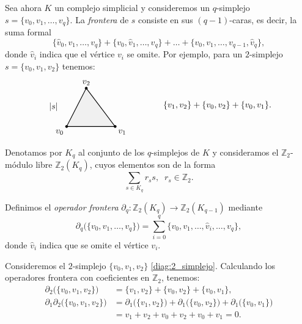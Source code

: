 Sea ahora $K$ un complejo simplicial y consideremos un $q$-simplejo $s = \{v_0, v_1, \dots, v_q\}$. La \textit{frontera} de $s$ consiste en sus $(q-1)$-caras, es decir, la suma formal
\[
\{\hat{v}_0, v_1, \dots, v_q\} + \{v_0, \hat{v}_1, \dots, v_q\} + \dots + \{v_0, v_1, \dots, v_{q-1}, \hat{v}_q\},
\]
donde $\hat{v}_i$ indica que el vértice $v_i$ se omite. Por ejemplo, para un $2$-simplejo $s = \{v_0, v_1, v_2\}$ tenemos:
\begin{equation}
\label{diag:2_simplejo}
\begin{tikzpicture}[baseline=(current bounding box.center), scale=0.95]
    \coordinate (V0) at (0, 0);
    \coordinate (V1) at (2.1, 0);
    \coordinate (V2) at (0.85, 1.65);

    \fill[gray!12] (V0) -- (V1) -- (V2) -- cycle;
    \draw[thick] (V0) -- (V1) -- (V2) -- cycle;

    \filldraw (V0) circle (1.5pt) node[below left] {$v_0$};
    \filldraw (V1) circle (1.5pt) node[below right] {$v_1$};
    \filldraw (V2) circle (1.5pt) node[above] {$v_2$};

    \node[left] at (-0.25, 0.85) {$|s|$};
\end{tikzpicture}
\qquad \qquad
\{v_1, v_2\} + \{v_0, v_2\} + \{v_0, v_1\}.
\end{equation}

\begin{definicion}
Denotamos por $K_q$ al conjunto de los $q$-simplejos de $K$ y consideramos el $\mathbb{Z}_2$-módulo libre $\mathbb{Z}_2(K_q)$, cuyos elementos son de la forma
\[
\sum_{s \in K_q} r_s s, \;\; r_s \in \mathbb{Z}_2.
\]
\end{definicion}
\begin{definicion}
Definimos el \textit{operador frontera} $\partial_q \colon \mathbb{Z}_2(K_q) \to \mathbb{Z}_2(K_{q-1})$ mediante
\[
\partial_q\big(\{v_0, v_1, \dots, v_q\}\big) = \sum_{i=0}^q \{v_0, v_1, \dots, \hat{v}_i, \dots, v_q\},
\]
donde $\hat{v}_i$ indica que se omite el vértice $v_i$.
\end{definicion}



\begin{ejemplo}
Consideremos el $2$-simplejo $\{v_0, v_1, v_2\}$ \ref{diag:2_simplejo}.
Calculando los operadores frontera con coeficientes en $\mathbb{Z}_2$, tenemos:
\begin{align*}
\partial_2\big(\{v_0, v_1, v_2\}\big) &= \{v_1, v_2\} + \{v_0, v_2\} + \{v_0, v_1\}, \\[1ex]
\partial_1 \partial_2\big(\{v_0, v_1, v_2\}\big) &= \partial_1\big(\{v_1, v_2\}\big) + \partial_1\big(\{v_0, v_2\}\big) + \partial_1\big(\{v_0, v_1\}\big) \\
&= v_1 + v_2 + v_0 + v_2 + v_0 + v_1 = 0.
\end{align*}
\end{ejemplo}


